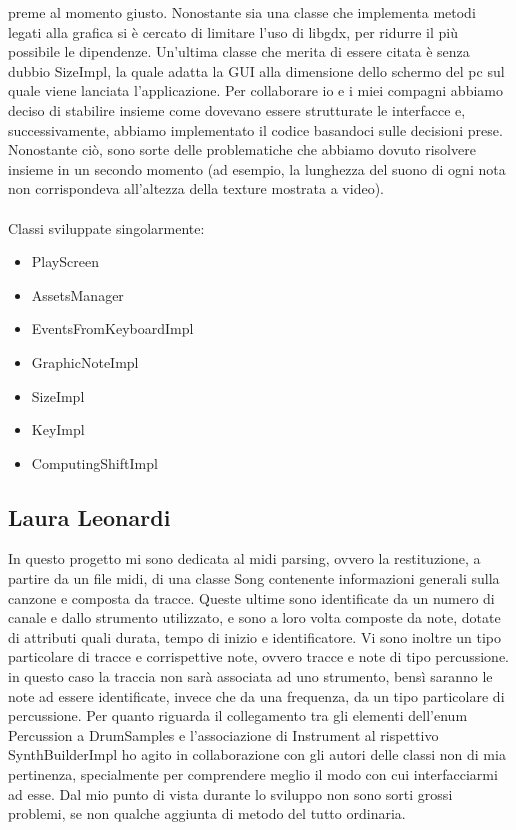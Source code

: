 \documentclass[a4paper,12pt]{report}
\begin{document}
{preme al momento giusto. Nonostante sia una classe che implementa metodi legati alla grafica si è cercato di limitare l'uso di libgdx, per ridurre il più
possibile le dipendenze. Un'ultima classe che merita di essere citata è senza dubbio SizeImpl, la quale adatta la GUI alla dimensione dello schermo del pc sul quale viene 
lanciata l'applicazione.
Per collaborare io e i miei compagni abbiamo deciso di stabilire insieme come dovevano essere strutturate le interfacce e, successivamente, abbiamo implementato il codice basandoci sulle decisioni prese. Nonostante ciò, sono sorte delle problematiche che abbiamo dovuto risolvere insieme in un secondo momento (ad esempio, la lunghezza del suono di ogni nota non corrispondeva all'altezza della texture mostrata a video).  
\\ \\
Classi sviluppate singolarmente:
{
	\begin{itemize}
		\item PlayScreen
		\item AssetsManager
		\item EventsFromKeyboardImpl
		\item GraphicNoteImpl
		\item SizeImpl
		\item KeyImpl
		\item ComputingShiftImpl
	\end{itemize}
}
\hfill\break

\subsection{Laura Leonardi}}
In questo progetto mi sono dedicata al midi parsing, ovvero la restituzione, a partire da un file midi, di una classe Song contenente informazioni generali sulla canzone e composta da tracce. Queste ultime sono identificate da un numero di canale e dallo strumento utilizzato, e sono a loro volta composte da note, dotate di attributi quali durata, tempo di inizio e identificatore. Vi sono inoltre un tipo particolare di tracce e corrispettive note, ovvero tracce e note di tipo percussione. in questo caso la traccia non sarà associata ad uno strumento, bensì saranno le note ad essere identificate, invece che da una frequenza, da un tipo particolare di percussione. Per quanto riguarda il collegamento tra gli elementi dell'enum Percussion a DrumSamples e l'associazione di Instrument al rispettivo SynthBuilderImpl ho agito in collaborazione con gli autori delle classi non di mia pertinenza, specialmente per comprendere meglio il modo con cui interfacciarmi ad esse. Dal mio punto di vista durante lo sviluppo non sono sorti grossi problemi, se non qualche aggiunta di metodo del tutto ordinaria.\\ \\
\end{document}
